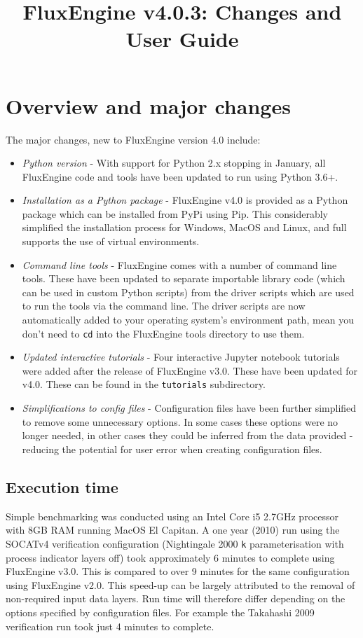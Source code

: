 \documentclass[]{scrartcl}
\title{FluxEngine v4.0.3: Changes and User Guide}
\begin{document}
\maketitle
\tableofcontents
\sloppy %

\section{Overview and major changes}
The major changes, new to FluxEngine version 4.0 include:
\begin{itemize}
	\item \textit{Python version} - With support for Python 2.x stopping in January, all FluxEngine code and tools have been updated to run using Python 3.6+.
	\item \textit{Installation as a Python package} - FluxEngine v4.0 is provided as a Python package which can be installed from PyPi using Pip. This considerably simplified the installation process for Windows, MacOS and Linux, and full supports the use of virtual environments.
	\item \textit{Command line tools} - FluxEngine comes with a number of command line tools. These have been updated to separate importable library code (which can be used in custom Python scripts) from the driver scripts which are used to run the tools via the command line. The driver scripts are now automatically added to your operating system's environment path, mean you don't need to \texttt{cd} into the FluxEngine tools directory to use them.
	\item \textit{Updated interactive tutorials} - Four interactive Jupyter notebook tutorials were added after the release of FluxEngine v3.0. These have been updated for v4.0. These can be found in the \texttt{tutorials} subdirectory.
	\item \textit{Simplifications to config files} - Configuration files have been further simplified to remove some unnecessary options. In some cases these options were no longer needed, in other cases they could be inferred from the data provided - reducing the potential for user error when creating configuration files.
\end{itemize}

\subsection{Execution time}
Simple benchmarking was conducted using an Intel Core i5 2.7GHz processor with 8GB RAM running MacOS El Capitan. A one year (2010) run using the SOCATv4 verification configuration (Nightingale 2000 \texttt{k} parameterisation with process indicator layers off) took approximately 6 minutes to complete using FluxEngine v3.0. This is compared to over 9 minutes for the same configuration using FluxEngine v2.0. This speed-up can be largely attributed to the removal of non-required input data layers. Run time will therefore differ depending on the options specified by configuration files. For example the Takahashi 2009 verification run took just 4 minutes to complete.
\end{document}
